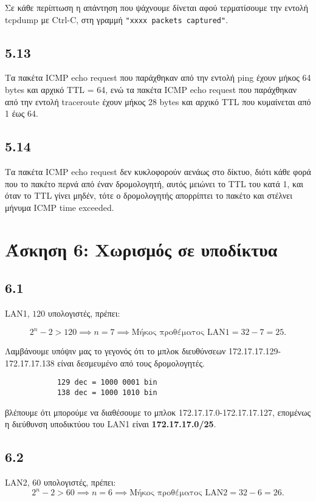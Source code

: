 \documentclass[a4paper, 12pt]{article}
\begin{document}
		Σε κάθε περίπτωση η απάντηση που ψάχνουμε δίνεται αφού τερματίσουμε την εντολή tcpdump με Ctrl-C, στη γραμμή \verb|"xxxx packets captured"|.

	\subsection*{5.13} 
		Τα πακέτα ICMP echo request που παράχθηκαν από την εντολή ping έχουν μήκος 64 bytes και αρχικό TTL = 64, ενώ τα πακέτα ICMP echo request που παράχθηκαν από την εντολή traceroute έχουν μήκος 28 bytes και αρχικό TTL που κυμαίνεται από 1 έως 64. 

	\subsection*{5.14} 
		Τα πακέτα ICMP echo request δεν κυκλοφορούν αενάως στο δίκτυο, διότι κάθε φορά που το πακέτο περνά από έναν δρομολογητή, αυτός μειώνει το TTL του κατά 1, και όταν το TTL γίνει μηδέν, τότε ο δρομολογητής απορρίπτει το πακέτο και στέλνει μήνυμα ICMP time exceeded. 

\section*{Άσκηση 6: Χωρισμός σε υποδίκτυα}

	\subsection*{6.1}
		LAN1, $120$ υπολογιστές, πρέπει: 
		
		\[
			2^n-2>120 \implies n = 7 \implies \text{Μήκος προθέματος LAN1} = 32 - 7 = 25. 
		\]
		
		Λαμβάνουμε υπόψιν μας το γεγονός ότι το μπλοκ διευθύνσεων 172.17.17.129-172.17.17.138 είναι δεσμευμένο από τους δρομολογητές.
		
		\begin{verbatim}
			129 dec = 1000 0001 bin
			138 dec = 1000 1010 bin
		\end{verbatim}
		
		βλέπουμε ότι μπορούμε να διαθέσουμε το μπλοκ 172.17.17.0-172.17.17.127, επομένως η διεύθυνση υποδικτύου του LAN1 είναι \textbf{172.17.17.0/25}.

	\subsection*{6.2}
		LAN2, $60$ υπολογιστές, πρέπει:
		\[ 
			2^n-2>60 \implies n = 6 \implies \text{Μήκος προθέματος LAN2} = 32 - 6 = 26. 
		\]
		
\end{document}
